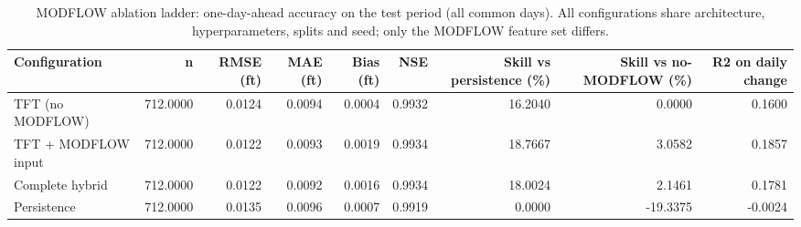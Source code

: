 \begin{table}[htbp]
\centering
\caption{MODFLOW ablation ladder: one-day-ahead accuracy on the test period (all common days). All configurations share architecture, hyperparameters, splits and seed; only the MODFLOW feature set differs.}
\label{tab:ablation_test}
\begin{tabular}{lrrrrrrrr}
\hline
Configuration & n & RMSE (ft) & MAE (ft) & Bias (ft) & NSE & Skill vs persistence (\%) & Skill vs no-MODFLOW (\%) & R2 on daily change \\
\hline
TFT (no MODFLOW) & 712.0000 & 0.0124 & 0.0094 & 0.0004 & 0.9932 & 16.2040 & 0.0000 & 0.1600 \\
TFT + MODFLOW input & 712.0000 & 0.0122 & 0.0093 & 0.0019 & 0.9934 & 18.7667 & 3.0582 & 0.1857 \\
Complete hybrid & 712.0000 & 0.0122 & 0.0092 & 0.0016 & 0.9934 & 18.0024 & 2.1461 & 0.1781 \\
Persistence & 712.0000 & 0.0135 & 0.0096 & 0.0007 & 0.9919 & 0.0000 & -19.3375 & -0.0024 \\
\hline
\end{tabular}
\end{table}